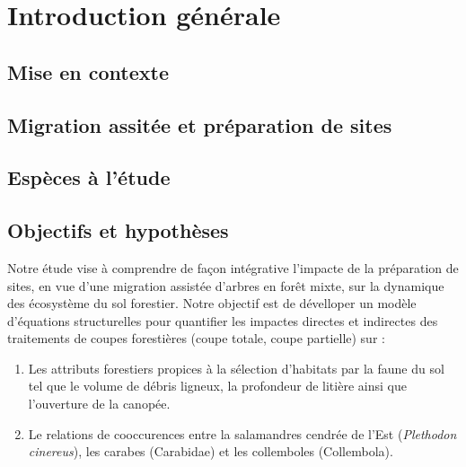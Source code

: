 \chapter*{Introduction générale}         %
\label{chap-introduction}       %

\section*{Mise en contexte}
\label{sec:contexte}


\section*{Migration assitée et préparation de sites}
\label{sec:contexte}


\section*{Espèces à l'étude}
\label{sec:contexte}


\section*{Objectifs et hypothèses}
\label{sec:objectifs}

Notre étude vise à comprendre de façon intégrative l'impacte de la préparation de sites, en vue d'une migration assistée d'arbres en forêt mixte, sur la dynamique des écosystème du sol forestier.
Notre objectif est de dévelloper un modèle d'équations structurelles pour quantifier les impactes directes et indirectes des traitements de coupes forestières (coupe totale, coupe partielle) sur : 

\begin{enumerate}
    \item Les attributs forestiers propices à la sélection d'habitats par la faune du sol tel que le volume de débris ligneux, la profondeur de litière ainsi que l'ouverture de la canopée. 
    \item Le relations de cooccurences entre la salamandres cendrée de l'Est (\textit{Plethodon cinereus}), les carabes (Carabidae) et les collemboles (Collembola).
\end{enumerate}

